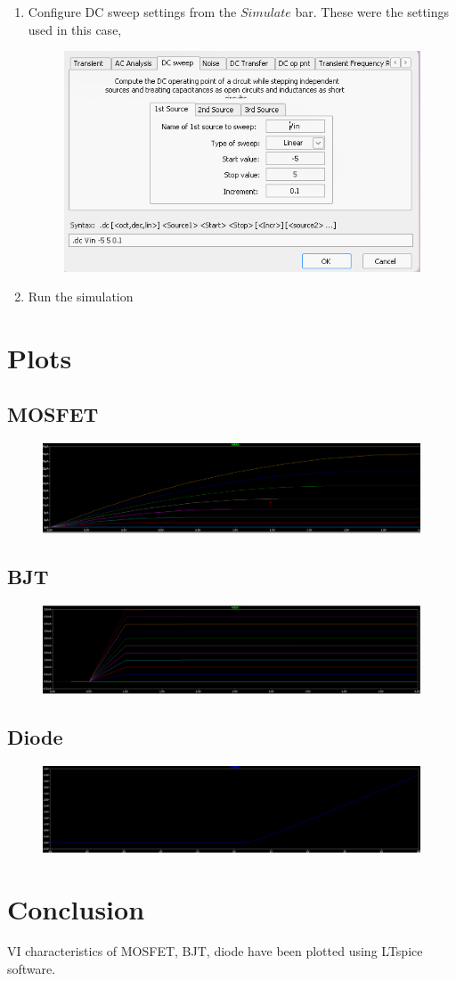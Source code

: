 \documentclass[12pt,a4paper]{report}
\begin{document}
\begin{enumerate}
    \item Configure DC sweep settings from the $Simulate$ bar. These were the settings used in this case,
    \begin{figure}[h!]
        \centering
        \includegraphics[width=0.5\linewidth]{figs/diode-sweep.png}
        \label{fig:placeholder}
    \end{figure}
    
    \item Run the simulation
\end{enumerate}
\section{Plots}
    \subsection{MOSFET}
    \begin{figure}[h!]
        \centering
        \includegraphics[width=1\linewidth]{figs/mosfet-plot.png}
    \end{figure}
    \subsection{BJT}
    \begin{figure}[h!]
        \centering
        \includegraphics[width=1\linewidth]{figs/bjt-plot.png}
    \end{figure}
    \subsection{Diode}
    \begin{figure}[h!]
        \centering
        \includegraphics[width=1\linewidth]{figs/diode-plot.png}
    \end{figure}
\section{Conclusion}
VI characteristics of MOSFET, BJT, diode have been plotted using LTspice software.
\end{document}
